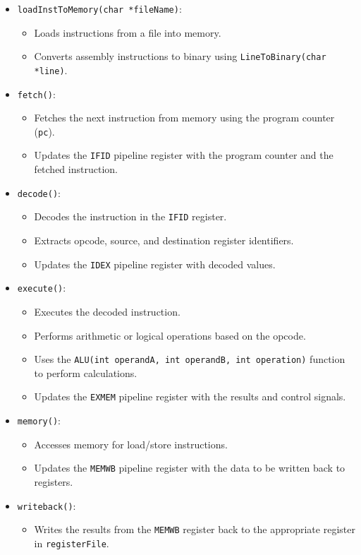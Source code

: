 \documentclass{article}
\begin{document}
\begin{itemize}
    \item \texttt{loadInstToMemory(char *fileName)}:
    \begin{itemize}
        \item Loads instructions from a file into memory.
        \item Converts assembly instructions to binary using \texttt{LineToBinary(char *line)}.
    \end{itemize}
    \item \texttt{fetch()}:
    \begin{itemize}
        \item Fetches the next instruction from memory using the program counter (\texttt{pc}).
        \item Updates the \texttt{IFID} pipeline register with the program counter and the fetched instruction.
    \end{itemize}
    \item \texttt{decode()}:
    \begin{itemize}
        \item Decodes the instruction in the \texttt{IFID} register.
        \item Extracts opcode, source, and destination register identifiers.
        \item Updates the \texttt{IDEX} pipeline register with decoded values.
    \end{itemize}
    \item \texttt{execute()}:
    \begin{itemize}
        \item Executes the decoded instruction.
        \item Performs arithmetic or logical operations based on the opcode.
        \item Uses the \texttt{ALU(int operandA, int operandB, int operation)} function to perform calculations.
        \item Updates the \texttt{EXMEM} pipeline register with the results and control signals.
    \end{itemize}
    \item \texttt{memory()}:
    \begin{itemize}
        \item Accesses memory for load/store instructions.
        \item Updates the \texttt{MEMWB} pipeline register with the data to be written back to registers.
    \end{itemize}
    \item \texttt{writeback()}:
    \begin{itemize}
        \item Writes the results from the \texttt{MEMWB} register back to the appropriate register in \texttt{registerFile}.
    \end{itemize}
\end{itemize}
\end{document}
